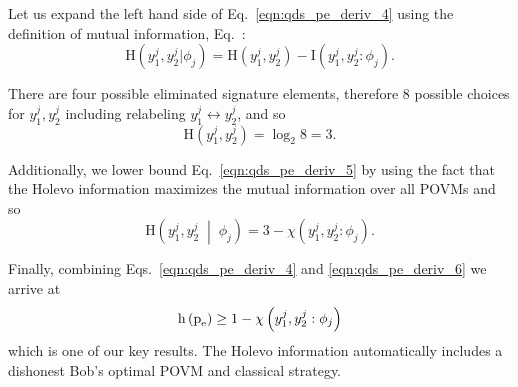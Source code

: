 \noindent Let us expand the left hand side of Eq.~\ref{eqn:qds_pe_deriv_4} using the definition of mutual information, Eq.~:
\begin{equation}\label{eqn:qds_pe_deriv_5}
\text{H}\left(y_1^j, y_2^j | \phi_j\right) = \text{H}\left(y_1^j, y_2^j\right) - \text{I}\left(y_1^j, y_2^j : \phi_j\right).
\end{equation}

\noindent There are four possible eliminated signature elements, therefore $8$ possible choices for $y_1^j, y_2^j$ including relabeling $y_1^j \leftrightarrow y_2^j$, and so 
\begin{equation}
\text{H}\left(y_1^j, y_2^j\right) = \log_2 8 = 3.
\end{equation}

\noindent Additionally, we lower bound Eq.~\ref{eqn:qds_pe_deriv_5} by using the fact that the Holevo information maximizes the mutual information over all POVMs 
and so
\begin{equation}\label{eqn:qds_pe_deriv_6}
\text{H}\left(y_1^j, y_2^j \;\middle|\; \phi_j \right) = 3 - \chi\left(y_1^j, y_2^j : \phi_j\right).
\end{equation}

\noindent Finally, combining Eqs.~\ref{eqn:qds_pe_deriv_4} and \ref{eqn:qds_pe_deriv_6} we arrive at
\begin{equation}\label{eqn:qds_hpe}
\text{h}\left(\text{p}_{\text{e}}\right) \ge 1 - \chi \left(y_1^j, y_2^j : \phi_j\right)
\end{equation}
which is one of our key results. The Holevo information automatically includes a dishonest Bob's optimal POVM and classical strategy.


